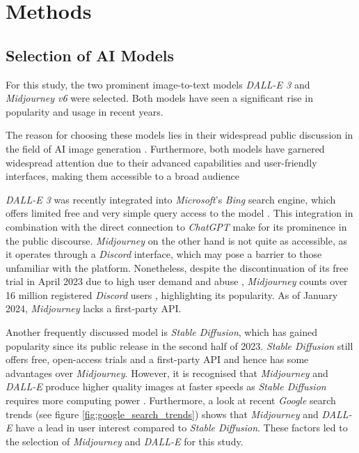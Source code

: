 \section{Methods}

\subsection{Selection of AI Models}
For this study, the two prominent image-to-text models \textit{DALL-E 3} and \textit{Midjourney v6} were selected. Both models have seen a significant rise in popularity and usage in recent years. 

The reason for choosing these models lies in their widespread public discussion in the field of AI image generation \parencite{Gibson2023, Gindham2023, Guiness2023}. Furthermore, both models have garnered widespread attention due to their advanced capabilities and user-friendly interfaces, making them accessible to a broad audience \parencite{Thomas2023}

\textit{DALL-E 3} was recently integrated into \textit{Microsoft}'s \textit{Bing} search engine, which offers limited free and very simple query access to the model \parencite{Bing2024} . This integration in combination with the direct connection to \textit{ChatGPT} make for its prominence in the public discourse. \textit{Midjourney} on the other hand is not quite as accessible, as it operates through a \textit{Discord} interface, which may pose a barrier to those unfamiliar with the platform. Nonetheless, despite the discontinuation of its free trial in April 2023 due to high user demand and abuse \parencite{Weiss2023}, \textit{Midjourney} counts over 16 million registered \textit{Discord} users \parencite{Krivec2023}, highlighting its popularity. As of January 2024, \textit{Midjourney} lacks a first-party API.

Another frequently discussed model is \textit{Stable Diffusion}, which has gained popularity since its public release in the second half of 2023. \textit{Stable Diffusion} still offers free, open-access trials and a first-party API and hence has some advantages over \textit{Midjourney}. However, it is recognised that \textit{Midjourney} and \textit{DALL-E} produce higher quality images at faster speeds as \textit{Stable Diffusion} requires more computing power \parencite{Kothari2023}. Furthermore, a look at recent \textit{Google} search trends (see figure \ref{fig:google_search_trends}) shows that \textit{Midjourney} and \textit{DALL-E} have a lead in user interest compared to \textit{Stable Diffusion}. These factors led to the selection of  \textit{Midjourney} and \textit{DALL-E} for this study.

